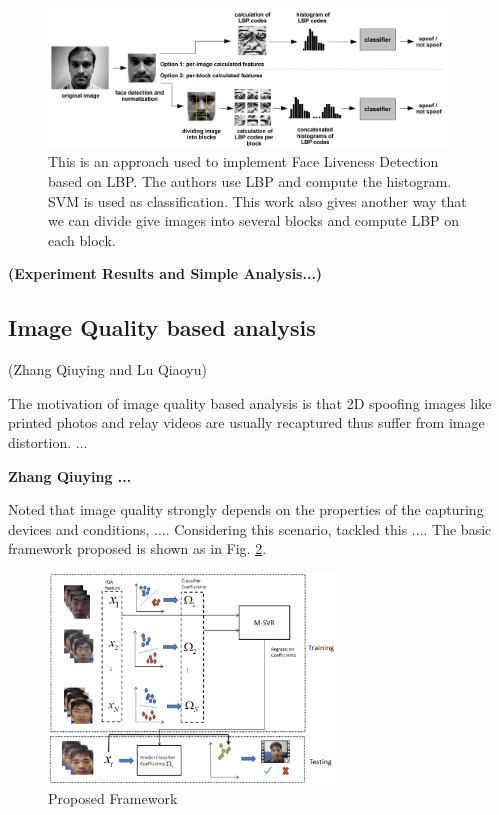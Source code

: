 \documentclass[journal]{IEEEtran}
\begin{document}
\begin{figure}[htbp]
\centering
\includegraphics[width=0.95\textwidth]{img/2-A-(1).png}
\caption{This is an approach \cite{chingovska2012effectiveness} used to implement Face Liveness Detection based on LBP. The authors use LBP and compute the histogram. SVM is used as classification. This work also gives another way that we can divide give images into several blocks and compute LBP on each block.}
\label{lbp_based_approach}
\end{figure}

\bigskip

\textbf{(Experiment Results and Simple Analysis...)}


\subsection{Image Quality based analysis}

(Zhang Qiuying and Lu Qiaoyu)

The motivation of image quality based analysis is that 2D spoofing images like printed photos and relay videos are usually recaptured thus suffer from image distortion. ...

\textbf{Zhang Qiuying ...}

Noted that image quality strongly depends on the properties of the capturing devices and conditions, .... Considering this scenario, \cite{li2016face} tackled this .... The basic framework proposed is shown as in Fig. \ref{fig.b.2.fram}. 

\begin{figure}[!t]
\centering
\includegraphics[width=3in]{img/2-B-2-(1).png}
\caption{Proposed Framework \cite{li2016face}}
\label{fig.b.2.fram}
\end{figure}
\end{document}
